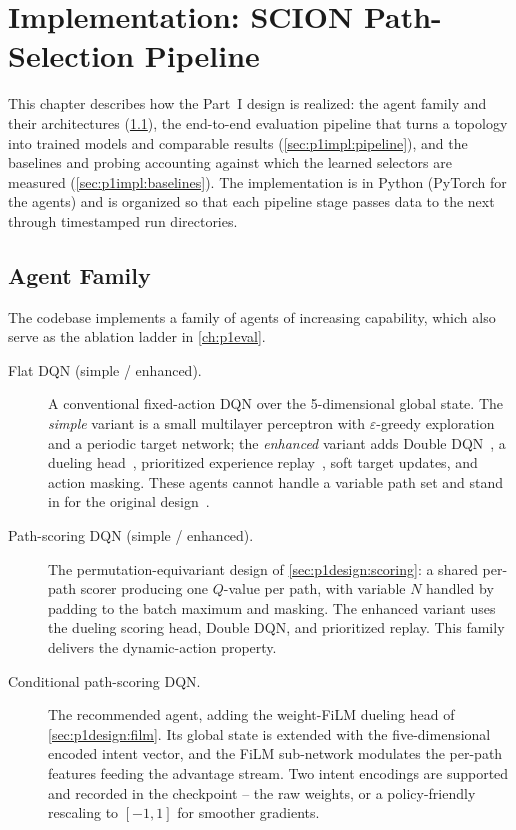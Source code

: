\chapter{Implementation: SCION Path-Selection Pipeline}
\label{ch:p1impl}

This chapter describes how the Part~I design is realized: the agent family and their architectures
(\cref{sec:p1impl:agents}), the end-to-end evaluation pipeline that turns a topology into trained models
and comparable results (\cref{sec:p1impl:pipeline}), and the baselines and probing accounting against
which the learned selectors are measured (\cref{sec:p1impl:baselines}). The implementation is in Python
(PyTorch for the agents) and is organized so that each pipeline stage passes data to the next through
timestamped run directories.

\section{Agent Family}
\label{sec:p1impl:agents}

The codebase implements a family of agents of increasing capability, which also serve as the ablation
ladder in \cref{ch:p1eval}.

\begin{description}
  \item[Flat DQN (simple / enhanced).] A conventional fixed-action DQN over the 5-dimensional global
  state. The \emph{simple} variant is a small multilayer perceptron with $\varepsilon$-greedy
  exploration and a periodic target network; the \emph{enhanced} variant adds Double
  DQN~\cite{VanHasselt2016}, a dueling head~\cite{Wang2016}, prioritized experience
  replay~\cite{Schaul2016}, soft target updates, and action masking. These agents cannot handle a
  variable path set and stand in for the original design~\cite{Bourak2025}.
  \item[Path-scoring DQN (simple / enhanced).] The permutation-equivariant design of
  \cref{sec:p1design:scoring}: a shared per-path scorer producing one $Q$-value per path, with variable
  $N$ handled by padding to the batch maximum and masking. The enhanced variant uses the dueling scoring
  head, Double DQN, and prioritized replay. This family delivers the dynamic-action property.
  \item[Conditional path-scoring DQN.] The recommended agent, adding the weight-FiLM dueling head of
  \cref{sec:p1design:film}. Its global state is extended with the five-dimensional encoded intent vector,
  and the FiLM sub-network modulates the per-path features feeding the advantage stream. Two intent
  encodings are supported and recorded in the checkpoint -- the raw weights, or a policy-friendly rescaling
  to $[-1,1]$ for smoother gradients.
\end{description}

